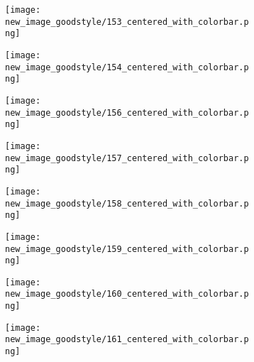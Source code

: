 \documentclass[a4paper,12pt]{article}
\begin{document}
\begin{figure}[H]
  \begin{subfigure}{0.11\textwidth}
    \texttt{[image: new\_image\_goodstyle/153\_centered\_with\_colorbar.png]}
  \end{subfigure}
  \hfill
  \begin{subfigure}{0.11\textwidth}
    \texttt{[image: new\_image\_goodstyle/154\_centered\_with\_colorbar.png]}
  \end{subfigure}
  \hfill
  \begin{subfigure}{0.11\textwidth}
    \texttt{[image: new\_image\_goodstyle/156\_centered\_with\_colorbar.png]}
  \end{subfigure}
  \hfill
  \begin{subfigure}{0.11\textwidth}
    \texttt{[image: new\_image\_goodstyle/157\_centered\_with\_colorbar.png]}
  \end{subfigure}
  \hfill
  \begin{subfigure}{0.11\textwidth}
    \texttt{[image: new\_image\_goodstyle/158\_centered\_with\_colorbar.png]}
  \end{subfigure}
  \hfill
  \begin{subfigure}{0.11\textwidth}
    \texttt{[image: new\_image\_goodstyle/159\_centered\_with\_colorbar.png]}
  \end{subfigure}
  \hfill
  \begin{subfigure}{0.11\textwidth}
    \texttt{[image: new\_image\_goodstyle/160\_centered\_with\_colorbar.png]}
  \end{subfigure}
  \hfill
  \begin{subfigure}{0.11\textwidth}
    \texttt{[image: new\_image\_goodstyle/161\_centered\_with\_colorbar.png]}
  \end{subfigure}
  \hfill
\end{figure}
\end{document}
